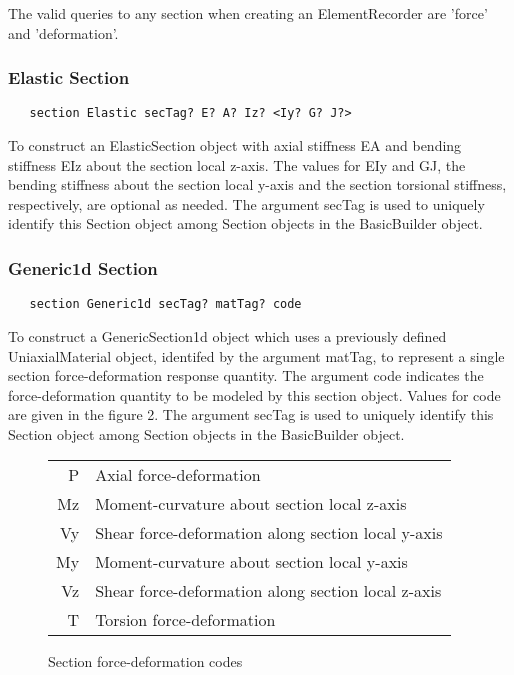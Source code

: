 \documentclass[12pt]{article}
\begin{document}
The valid queries to any section when creating an ElementRecorder
are 'force' and 'deformation'.

\subsubsection{Elastic Section}
{\sf\small
\begin{verbatim}
   section Elastic secTag? E? A? Iz? <Iy? G? J?>
\end{verbatim}
}

To construct an ElasticSection object with axial stiffness EA and 
bending stiffness EIz about the section local z-axis. The values 
for EIy and GJ, the bending stiffness about the section local
y-axis and the section torsional stiffness, respectively, are optional
as needed. The argument secTag is used to uniquely identify this 
Section object among Section objects in the BasicBuilder object.

\subsubsection{Generic1d Section}
{\sf\small
\begin{verbatim}
   section Generic1d secTag? matTag? code
\end{verbatim}
}

To construct a GenericSection1d object which uses a previously defined
UniaxialMaterial object, identifed by the argument matTag, to represent
a single section force-deformation response quantity. The argument code indicates
the force-deformation quantity to be modeled by this section object.
Values for code are given in the figure 2. The 
argument secTag is used to uniquely identify this Section object among 
Section objects in the BasicBuilder object. 

\begin{figure}[htpb]
\begin{center}
\begin{tabular}{||r|l||} \hline
 P & Axial force-deformation \\
 Mz & Moment-curvature about section local z-axis \\
 Vy & Shear force-deformation along section local y-axis \\
 My & Moment-curvature about section local y-axis \\
 Vz & Shear force-deformation along section local z-axis \\
 T & Torsion force-deformation \\ \hline
\end{tabular}
\caption{Section force-deformation codes}
\label{sectionCodes}
\end{center}
\end{figure}
\end{document}

